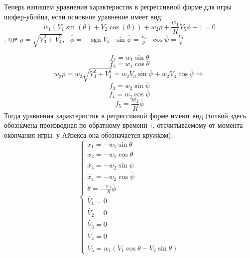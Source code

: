 \documentclass[14pt,a4paper]{extarticle}
\begin{document}
	Теперь напишем уравнения характеристик в регрессивной форме для игры шофер-убийца, если основное уравнение имеет вид:
	\[w_1(V_1\sin(\theta) + V_2\cos(\theta)) + w_2\rho + \frac{w_1}{R} V_5 \overline{\phi} + 1 = 0\], где $\rho = \sqrt{V_3^2 + V_4^2}, \ \ \ \overline{\phi} = -\operatorname{sgn} V_5 \ \ \ \sin{\overline{\psi}} = \frac{V_3}{\rho} \ \ \ \cos{\overline{\psi}} = \frac{V_4}{\rho}$
	
	\[f_1 = w_1 \sin{\theta} \]
	\[f_2 = w_1 \cos{\theta} \]
	\[w_2 \rho = w_2 \sqrt{V_3^2 + V_4^2} = w_2V_3\sin{\overline\psi} + w_2V_4\cos{\overline\psi} \Rightarrow\]
	\[f_3 = w_2\sin{\overline\psi}\]
	\[f_4 = w_2\cos{\overline\psi}\]
	\[f_5 = \frac{w_1}{R} \overline{\phi}\]
	Тогда уравнения характеристик в регрессивной форме имеют вид (точкой здесь обозначена производная по обратному времени $\tau$, отсчитываемому от момента окончания игры; у Айзекса она обозначается кружком):
	\begin{equation*}
		\begin{cases}
			\dot{x_{1}} = -w_1 \sin{\theta} \\
			\dot{x_{2}} = -w_1 \cos{\theta} \\
			\dot{x_{3}} = -w_2 \sin{\overline\psi} \\
			\dot{x_{4}} = -w_2 \cos{\overline\psi} \\
			\dot{\theta} = -\frac{w_1}{R}\overline{\phi} \\
			\dot{V_1} = 0 \\
			\dot{V_2} = 0 \\
			\dot{V_3} = 0 \\
			\dot{V_4} = 0 \\
			\dot{V_5} = w_1(V_1\cos{\theta} - V_2\sin{\theta})
	\end{cases}
	\end{equation*}
	
\end{document}
